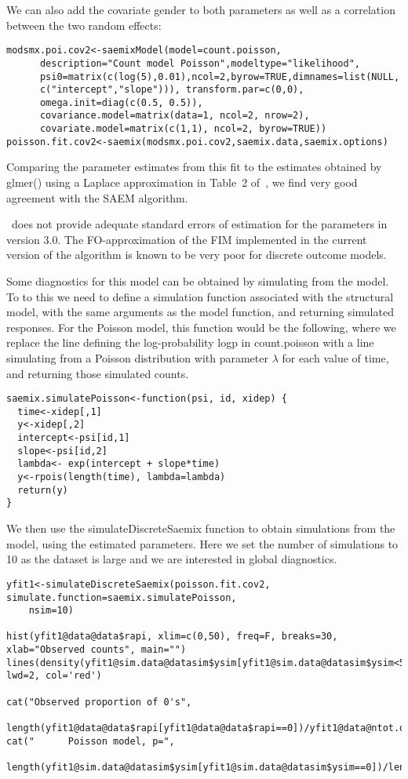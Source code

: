 We can also add the covariate gender to both parameters as well as a correlation between the two random effects:
\begin{verbatim}
modsmx.poi.cov2<-saemixModel(model=count.poisson,
      description="Count model Poisson",modeltype="likelihood",   
      psi0=matrix(c(log(5),0.01),ncol=2,byrow=TRUE,dimnames=list(NULL, 
      c("intercept","slope"))), transform.par=c(0,0), 
      omega.init=diag(c(0.5, 0.5)), 
      covariance.model=matrix(data=1, ncol=2, nrow=2),
      covariate.model=matrix(c(1,1), ncol=2, byrow=TRUE))
poisson.fit.cov2<-saemix(modsmx.poi.cov2,saemix.data,saemix.options)
\end{verbatim}
Comparing the parameter estimates from this fit to the estimates obtained by {\sf glmer()} using a Laplace approximation in Table~2 of~\cite{Atkins13}, we find very good agreement with the SAEM algorithm.

 \monolix~does not provide adequate standard errors of estimation for the parameters in version 3.0. The FO-approximation of the FIM implemented in the current version of the algorithm is known to be very poor for discrete outcome models.

Some diagnostics for this model can be obtained by simulating from the model. To to this we need to define a simulation function associated with the structural model, with the same arguments as the model function, and returning simulated responses. For the Poisson model, this function would be the following, where we replace the line defining the log-probability {\sf logp} in {\sf count.poisson} with a line simulating from a Poisson distribution with parameter $\lambda$ for each value of time, and returning those simulated counts.
\begin{verbatim}
saemix.simulatePoisson<-function(psi, id, xidep) {
  time<-xidep[,1]
  y<-xidep[,2]
  intercept<-psi[id,1]
  slope<-psi[id,2]
  lambda<- exp(intercept + slope*time)
  y<-rpois(length(time), lambda=lambda)
  return(y)
}
\end{verbatim}

We then use the {\sf simulateDiscreteSaemix} function to obtain simulations from the model, using the estimated parameters. Here we set the number of simulations to 10 as the dataset is large and we are interested in global diagnostics.
\begin{verbatim}
yfit1<-simulateDiscreteSaemix(poisson.fit.cov2, simulate.function=saemix.simulatePoisson, 
    nsim=10)

hist(yfit1@data@data$rapi, xlim=c(0,50), freq=F, breaks=30, xlab="Observed counts", main="")
lines(density(yfit1@sim.data@datasim$ysim[yfit1@sim.data@datasim$ysim<50]), lwd=2, col='red')

cat("Observed proportion of 0's", 
     length(yfit1@data@data$rapi[yfit1@data@data$rapi==0])/yfit1@data@ntot.obs,"\n")
cat("      Poisson model, p=",
    length(yfit1@sim.data@datasim$ysim[yfit1@sim.data@datasim$ysim==0])/length(yfit1@sim.data@datasim$ysim),"\n") 
\end{verbatim}

